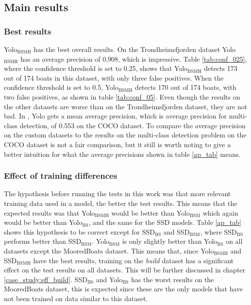 \vspace{3mm}

\newpage

\subsection{Main results}
\label{subsec:main}

\subsubsection{Best results}
Yolo$_{\text{BSMH}}$ has the best overall results. On the Trondheimsfjorden dataset Yolo$_{\text{BSMH}}$ has an average precision of 0.908, which is impressive. Table \ref{tab:conf_025}, where the confidence threshold is set to 0.25, shows that Yolo$_{\text{BSMH}}$ detects 173 out of 174 boats in this dataset, with only three false positives. When the confidence threshold is set to 0.5, Yolo$_{\text{BSMH}}$ detects 170 out of 174 boats, with two false positives, as shown in table \ref{tab:conf_05}. Even though the results on the other datasets are worse than on the Trondheimsfjorden dataset, they are not bad. In \citep{YOLOv3}, Yolo gets a mean average precision, which is average precision for multi-class detection, of 0.553 on the COCO dataset. To compare the average precision on the custom datasets to the results on the multi-class detection problem on the COCO dataset is not a fair comparison, but it still is worth noting to give a better intuition for what the average precisions shown in table \ref{ap_tab} means. 

\subsubsection{Effect of training differences}
The hypothesis before running the tests in this work was that more relevant training data used in a model, the better the test results. This means that the expected results was that Yolo$_{\text{BSMH}}$ would be better than Yolo$_{\text{BSM}}$ which again would be better than Yolo$_{\text{BS}}$, and the same for the SSD models. Table \ref{ap_tab} shows this hypothesis to be correct except for SSD$_{\text{BS}}$ and SSD$_{\text{BSM}}$, where SSD$_{\text{BS}}$ performs better than SSD$_{\text{BSM}}$. Yolo$_{\text{BSM}}$ is only slightly better than Yolo$_{\text{BS}}$ on all datasets except the MooredBoats dataset. This means that, since Yolo$_{\text{BSMH}}$ and SSD$_{\text{BSMH}}$ have the best results, training on the \textit{build} dataset has a significant effect on the test results on all datasets. This will be further discussed in chapter \ref{case_study:eff_build}. SSD$_{\text{BS}}$ and Yolo$_{\text{BS}}$ has the worst results on the MooredBoats dataset, this is expected since these are the only models that have not been trained on data similar to this dataset.

